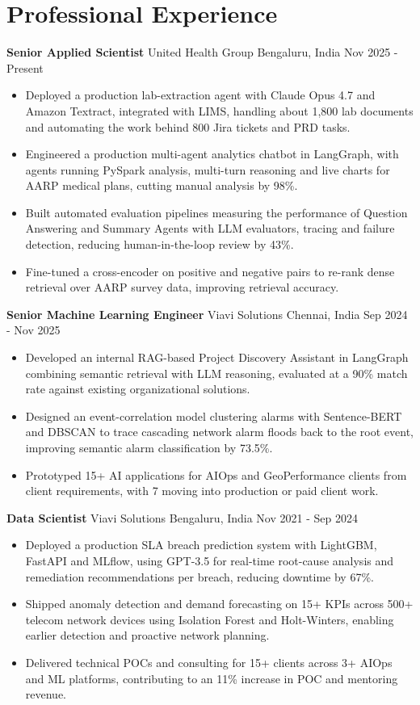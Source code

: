 \documentclass[10pt,a4paper]{article}
\newcommand{\role}[4]{\textbf{#1} \textbar{} #2 \hfill #3 \textbar{} #4\par}
\begin{document}
\section{Professional Experience}
\role{Senior Applied Scientist}{United Health Group}{Bengaluru, India}{Nov 2025 - Present}
\begin{itemize}
  \item Deployed a production lab-extraction agent with Claude Opus 4.7 and Amazon Textract, integrated with LIMS, handling about 1,800 lab documents and automating the work behind 800 Jira tickets and PRD tasks.
  \item Engineered a production multi-agent analytics chatbot in LangGraph, with agents running PySpark analysis, multi-turn reasoning and live charts for AARP medical plans, cutting manual analysis by 98\%.
  \item Built automated evaluation pipelines measuring the performance of Question Answering and Summary Agents with LLM evaluators, tracing and failure detection, reducing human-in-the-loop review by 43\%.
  \item Fine-tuned a cross-encoder on positive and negative pairs to re-rank dense retrieval over AARP survey data, improving retrieval accuracy.
\end{itemize}
\vspace{3pt}
\role{Senior Machine Learning Engineer}{Viavi Solutions}{Chennai, India}{Sep 2024 - Nov 2025}
\begin{itemize}
  \item Developed an internal RAG-based Project Discovery Assistant in LangGraph combining semantic retrieval with LLM reasoning, evaluated at a 90\% match rate against existing organizational solutions.
  \item Designed an event-correlation model clustering alarms with Sentence-BERT and DBSCAN to trace cascading network alarm floods back to the root event, improving semantic alarm classification by 73.5\%.
  \item Prototyped 15+ AI applications for AIOps and GeoPerformance clients from client requirements, with 7 moving into production or paid client work.
\end{itemize}
\vspace{3pt}
\role{Data Scientist}{Viavi Solutions}{Bengaluru, India}{Nov 2021 - Sep 2024}
\begin{itemize}
  \item Deployed a production SLA breach prediction system with LightGBM, FastAPI and MLflow, using GPT-3.5 for real-time root-cause analysis and remediation recommendations per breach, reducing downtime by 67\%.
  \item Shipped anomaly detection and demand forecasting on 15+ KPIs across 500+ telecom network devices using Isolation Forest and Holt-Winters, enabling earlier detection and proactive network planning.
  \item Delivered technical POCs and consulting for 15+ clients across 3+ AIOps and ML platforms, contributing to an 11\% increase in POC and mentoring revenue.
\end{itemize}
\end{document}
